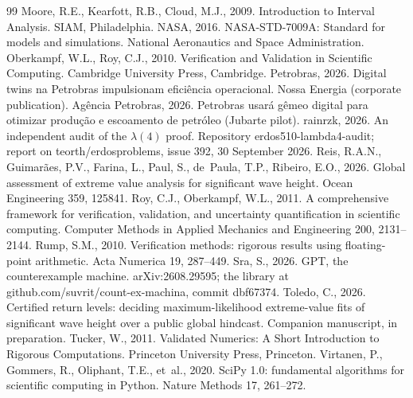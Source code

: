 \documentclass[preprint,11pt,authoryear]{elsarticle}
\begin{document}
\begin{thebibliography}{99}
 Moore, R.E., Kearfott, R.B., Cloud, M.J., 2009. Introduction to Interval Analysis. SIAM, Philadelphia.
 NASA, 2016. NASA-STD-7009A: Standard for models and simulations. National Aeronautics and Space Administration.
 Oberkampf, W.L., Roy, C.J., 2010. Verification and Validation in Scientific Computing. Cambridge University Press, Cambridge.
 Petrobras, 2026. Digital twins na Petrobras impulsionam efici\^encia operacional. Nossa Energia (corporate publication).
 Ag\^encia Petrobras, 2026. Petrobras usar\'a g\^emeo digital para otimizar produ\c{c}\~ao e escoamento de petr\'oleo (Jubarte pilot).
 rainrzk, 2026. An independent audit of the $\lambda(4)$ proof. Repository erdos510-lambda4-audit; report on teorth/erdosproblems, issue 392, 30 September 2026.
 Reis, R.A.N., Guimar\~aes, P.V., Farina, L., Paul, S., de~Paula, T.P., Ribeiro, E.O., 2026. Global assessment of extreme value analysis for significant wave height. Ocean Engineering 359, 125841.
 Roy, C.J., Oberkampf, W.L., 2011. A comprehensive framework for verification, validation, and uncertainty quantification in scientific computing. Computer Methods in Applied Mechanics and Engineering 200, 2131--2144.
 Rump, S.M., 2010. Verification methods: rigorous results using floating-point arithmetic. Acta Numerica 19, 287--449.
 Sra, S., 2026. GPT, the counterexample machine. arXiv:2608.29595; the library at github.com/suvrit/count-ex-machina, commit dbf67374.
 Toledo, C., 2026. Certified return levels: deciding maximum-likelihood extreme-value fits of significant wave height over a public global hindcast. Companion manuscript, in preparation.
 Tucker, W., 2011. Validated Numerics: A Short Introduction to Rigorous Computations. Princeton University Press, Princeton.
 Virtanen, P., Gommers, R., Oliphant, T.E., et~al., 2020. SciPy 1.0: fundamental algorithms for scientific computing in Python. Nature Methods 17, 261--272.
\end{thebibliography}
\end{document}
